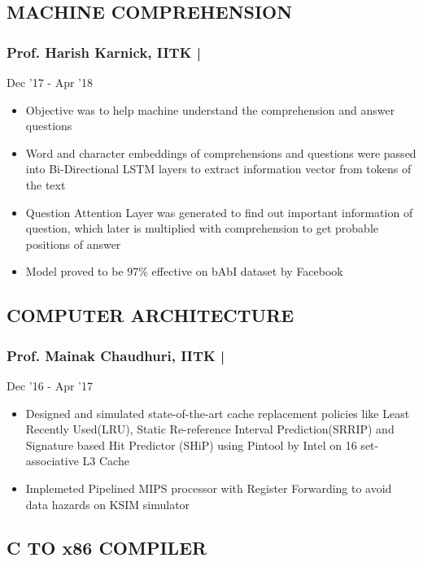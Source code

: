 \documentclass[letterpaper]{twentysecondcv} %
\begin{document}
\subsection{MACHINE COMPREHENSION}
\subsubsection{Prof. Harish Karnick, IITK | } \hfill{} Dec '17 - Apr '18

\begin{itemize}
\item Objective was to help machine understand the comprehension and answer questions
\item Word and character embeddings of comprehensions and questions were passed into Bi-Directional LSTM layers to extract information vector from tokens of the text
\item Question Attention Layer was generated to find out important information of question, which later is multiplied with comprehension to get probable positions of answer
\item Model proved to be 97\% effective on bAbI dataset by Facebook
\end{itemize}

\subsection{COMPUTER ARCHITECTURE}
\subsubsection{Prof. Mainak Chaudhuri, IITK | } \hfill{} Dec '16 - Apr '17

\begin{itemize}
\item Designed and simulated state-of-the-art cache replacement policies like Least Recently Used(LRU), Static Re-reference Interval Prediction(SRRIP) and Signature based Hit Predictor (SHiP) using Pintool by Intel on 16 set-associative L3 Cache
\item Implemeted Pipelined MIPS processor with Register Forwarding to avoid data hazards on KSIM simulator
\end{itemize}

\subsection{C TO x86 COMPILER}
\end{document}
